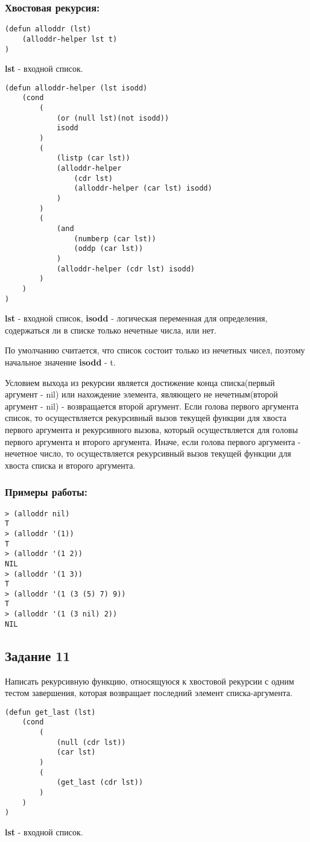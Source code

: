 \documentclass[a4paper,12pt]{article}
\begin{document}
\subsubsection*{Хвостовая рекурсия:}
\begin{lstlisting}[caption=Функция-обертка проверки на нечетность всех элементов списка]
(defun alloddr (lst)
	(alloddr-helper lst t)
)
\end{lstlisting}
\textbf{lst} - входной список.
\begin{lstlisting}[caption=Функция проверки на нечетность всех элементов списка]
(defun alloddr-helper (lst isodd)
	(cond	
		(
			(or (null lst)(not isodd))
			isodd
		)
		(
			(listp (car lst))
			(alloddr-helper 
				(cdr lst) 
				(alloddr-helper (car lst) isodd)
			)
		)
		(
			(and 
				(numberp (car lst))
				(oddp (car lst))
			)
			(alloddr-helper (cdr lst) isodd)
		)
	)
)
\end{lstlisting}
\textbf{lst} - входной список, \textbf{isodd} - логическая переменная для определения, содержаться ли в списке только нечетные числа, или нет.

По умолчанию считается, что список состоит только из нечетных чисел, поэтому начальное значение \textbf{isodd} - t.
 
Условием выхода из рекурсии является достижение конца списка(первый аргумент - nil) или нахождение элемента, являющего не нечетным(второй аргумент - nil) - возвращается второй аргумент. Если голова первого аргумента список, то осуществляется рекурсивный вызов текущей функции для хвоста первого аргумента и рекурсивного вызова, который осуществляется для головы первого аргумента и второго аргумента. Иначе, если голова первого аргумента - нечетное число, то осуществляется рекурсивный вызов текущей функции для хвоста списка и второго аргумента.

\subsubsection*{Примеры работы:}
\begin{lstlisting}
> (alloddr nil)
T
> (alloddr '(1))
T
> (alloddr '(1 2))
NIL
> (alloddr '(1 3))
T
> (alloddr '(1 (3 (5) 7) 9))
T
> (alloddr '(1 (3 nil) 2))
NIL
\end{lstlisting}

\subsection*{Задание 11}

Написать рекурсивную функцию, относящуюся к хвостовой рекурсии с одним тестом завершения, которая возвращает последний элемент списка-аргумента.
\begin{lstlisting}[caption=Функция получения последнего элемента списка]
(defun get_last (lst)
	(cond 
		(
			(null (cdr lst))
			(car lst)
		)
		(
			(get_last (cdr lst))
		)
	)
)
\end{lstlisting}
\textbf{lst} - входной список.
\end{document}
